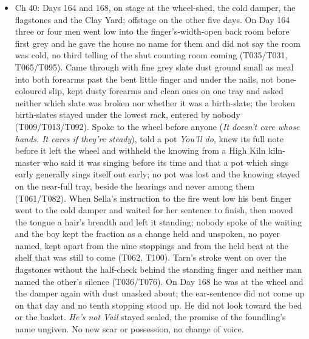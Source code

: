 \documentclass{design/chronicle}
\begin{document}
{\begin{itemize}[leftmargin=1.4em,itemsep=1pt,topsep=3pt,parsep=0pt]
\item Ch 40: Days 164 and 168, on stage at the wheel-shed, the cold damper, the flagstones and the Clay Yard; offstage on the other five days. On Day 164 three or four men went low into the finger’s-width-open back room before first grey and he gave the house no name for them and did not say the room was cold, no third telling of the shut counting room coming (T035/T031, T065/T095). Came through with fine grey slate dust ground small as meal into both forearms past the bent little finger and under the nails, not bone-coloured slip, kept dusty forearms and clean ones on one tray and asked neither which slate was broken nor whether it was a birth-slate; the broken birth-slates stayed under the lowest rack, entered by nobody (T009/T013/T092). Spoke to the wheel before anyone (\emph{It doesn’t care whose hands. It cares if they’re steady}), told a pot \emph{You’ll do}, knew its full note before it left the wheel and withheld the knowing from a High Kiln kiln-master who said it was singing before its time and that a pot which sings early generally sings itself out early; no pot was lost and the knowing stayed on the near-full tray, beside the hearings and never among them (T061/T082). When Sella’s instruction to the fire went low his bent finger went to the cold damper and waited for her sentence to finish, then moved the tongue a hair’s breadth and left it standing; nobody spoke of the waiting and the boy kept the fraction as a change held and unspoken, no payer named, kept apart from the nine stoppings and from the held beat at the shelf that was still to come (T062, T100). Tarn’s stroke went on over the flagstones without the half-check behind the standing finger and neither man named the other’s silence (T036/T076). On Day 168 he was at the wheel and the damper again with dust unasked about; the ear-sentence did not come up on that day and no tenth stopping stood up. He did not look toward the bed or the basket. \emph{He’s not Vail} stayed sealed, the promise of the foundling’s name ungiven. No new scar or possession, no change of voice.

\end{itemize}

\begin{itemize}[leftmargin=1.4em,itemsep=1pt,topsep=3pt,parsep=0pt]


\end{itemize}}
\end{document}
